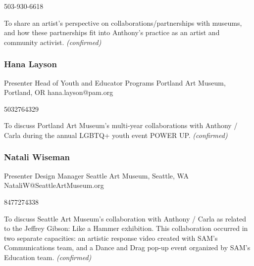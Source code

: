 \documentclass{report}
\begin{document}
                503-930-6618\newline

                To share an artist’s perspective on collaborations/partnerships with museums, and how these partnerships fit into Anthony’s practice as an artist and community activist.\newline
                \emph{ (confirmed) }
              

              
                \subsubsection*{ Hana Layson }
                Presenter\newline
                Head of Youth and Educator Programs\newline
                Portland Art Museum, Portland, OR
                \newline
                hana.layson@pam.org\newline
                
                5032764329\newline

                To discuss Portland Art Museum’s multi-year collaborations with Anthony / Carla during the annual LGBTQ+ youth event POWER UP.
                \emph{ (confirmed) }
              

              
                \subsubsection*{ Natali Wiseman }
                Presenter\newline
                Design Manager\newline
                Seattle Art Museum, Seattle, WA
                \newline
                NataliW@SeattleArtMuseum.org\newline
                
                8477274338\newline

                To discuss Seattle Art Museum’s collaboration with Anthony / Carla as related to the Jeffrey Gibson: Like a Hammer exhibition. This collaboration occurred in two separate capacities: an artistic response video created with  SAM’s Communications team, and a Dance and Drag pop-up event organized by SAM’s Education team.
                \emph{ (confirmed) }
              
\end{document}
